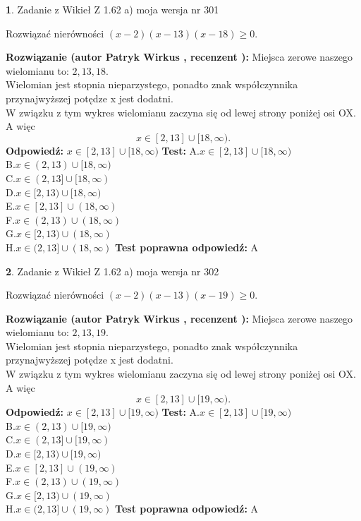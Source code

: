\documentclass[12pt, a4paper]{article}
\theoremstyle{definition} %
\newtheorem{zad}{}
\newcommand{\zadStart}[1]{\begin{zad}#1\newline}
\newcommand{\zadStop}{\end{zad}}
\newcommand{\rozwStart}[2]{\noindent \textbf{Rozwiązanie (autor #1 , recenzent #2): }\newline}
\newcommand{\rozwStop}{\newline}
\newcommand{\odpStart}{\noindent \textbf{Odpowiedź:}\newline}
\newcommand{\odpStop}{\newline}
\newcommand{\testStart}{\noindent \textbf{Test:}\newline}
\newcommand{\testStop}{\newline}
\newcommand{\kluczStart}{\noindent \textbf{Test poprawna odpowiedź:}\newline}
\newcommand{\kluczStop}{\newline}
\begin{document}
\zadStart{Zadanie z Wikieł Z 1.62 a) moja wersja nr 301}

Rozwiązać nierówności $(x-2)(x-13)(x-18)\ge0$.
\zadStop
\rozwStart{Patryk Wirkus}{}
Miejsca zerowe naszego wielomianu to: $2, 13, 18$.\\
Wielomian jest stopnia nieparzystego, ponadto znak współczynnika przy\linebreak najwyższej potędze x jest dodatni.\\ W związku z tym wykres wielomianu zaczyna się od lewej strony poniżej osi OX. A więc $$x \in [2,13] \cup [18,\infty).$$
\rozwStop
\odpStart
$x \in [2,13] \cup [18,\infty)$
\odpStop
\testStart
A.$x \in [2,13] \cup [18,\infty)$\\
B.$x \in (2,13) \cup [18,\infty)$\\
C.$x \in (2,13] \cup [18,\infty)$\\
D.$x \in [2,13) \cup [18,\infty)$\\
E.$x \in [2,13] \cup (18,\infty)$\\
F.$x \in (2,13) \cup (18,\infty)$\\
G.$x \in [2,13) \cup (18,\infty)$\\
H.$x \in (2,13] \cup (18,\infty)$
\testStop
\kluczStart
A
\kluczStop



\zadStart{Zadanie z Wikieł Z 1.62 a) moja wersja nr 302}

Rozwiązać nierówności $(x-2)(x-13)(x-19)\ge0$.
\zadStop
\rozwStart{Patryk Wirkus}{}
Miejsca zerowe naszego wielomianu to: $2, 13, 19$.\\
Wielomian jest stopnia nieparzystego, ponadto znak współczynnika przy\linebreak najwyższej potędze x jest dodatni.\\ W związku z tym wykres wielomianu zaczyna się od lewej strony poniżej osi OX. A więc $$x \in [2,13] \cup [19,\infty).$$
\rozwStop
\odpStart
$x \in [2,13] \cup [19,\infty)$
\odpStop
\testStart
A.$x \in [2,13] \cup [19,\infty)$\\
B.$x \in (2,13) \cup [19,\infty)$\\
C.$x \in (2,13] \cup [19,\infty)$\\
D.$x \in [2,13) \cup [19,\infty)$\\
E.$x \in [2,13] \cup (19,\infty)$\\
F.$x \in (2,13) \cup (19,\infty)$\\
G.$x \in [2,13) \cup (19,\infty)$\\
H.$x \in (2,13] \cup (19,\infty)$
\testStop
\kluczStart
A
\kluczStop
\end{document}
